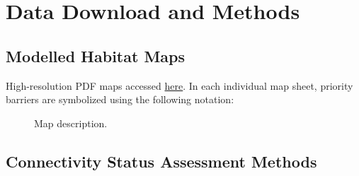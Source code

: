 \documentclass[
  letterpaper,
  DIV=11,
  numbers=noendperiod]{scrreprt}
\begin{document}
\renewcommand*{\arraystretch}{1}

\chapter*{Data Download and Methods}\label{data-download-and-methods}


\section*{Modelled Habitat Maps}\label{modelled-habitat-maps}


High-resolution PDF maps accessed \href{url}{here}. In each individual
map sheet, priority barriers are symbolized using the following
notation:

\begin{figure}


\caption{\label{fig-over}Map description.}

\end{figure}%

\section*{Connectivity Status Assessment
Methods}\label{connectivity-status-assessment-methods}
\end{document}
